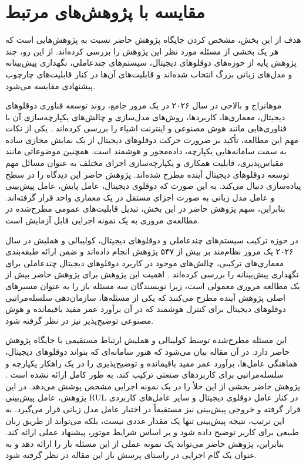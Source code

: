 \documentclass[a4paper,fleqn]{report}
\begin{document}
\section{مقایسه با پژوهش‌های مرتبط}
\label{sec:comparison}

هدف از این بخش، مشخص کردن جایگاه پژوهش حاضر نسبت به پژوهش‌هایی است که هر یک بخشی از مسئله مورد نظر این پژوهش را بررسی کرده‌اند. از این رو، چند پژوهش پایه از حوزه‌های دوقلوهای دیجیتال، سیستم‌های چندعاملی، نگهداری پیش‌بینانه و مدل‌های زبانی بزرگ انتخاب شده‌اند و قابلیت‌های آن‌ها در کنار قابلیت‌های چارچوب پیشنهادی مقایسه می‌شود.

موهانراج
 و
بالاجی
در سال ۲۰۲۶ در یک مرور جامع، روند توسعه فناوری
دوقلوهای دیجیتال، معماری‌ها، کاربردها، روش‌های مدل‌سازی و چالش‌های
یکپارچه‌سازی آن با فناوری‌هایی مانند هوش مصنوعی و اینترنت اشیاء را
بررسی کرده‌اند \cite{mohanraj2026digitaltwin}. یکی از نکات مهم این
مطالعه، تأکید بر ضرورت حرکت دوقلوهای دیجیتال از یک نمایش مجازی ساده به
سمت سامانه‌هایی یکپارچه، داده‌محور و هوشمند است. همچنین موضوعاتی مانند
مقیاس‌پذیری، قابلیت همکاری و یکپارچه‌سازی اجزای مختلف به عنوان مسائل
مهم توسعه دوقلوهای دیجیتال آینده مطرح شده‌اند. پژوهش حاضر این دیدگاه
را در سطح پیاده‌سازی دنبال می‌کند. به این صورت که دوقلوی دیجیتال،
عامل پایش، عامل پیش‌بینی و عامل مدل زبانی به صورت اجزای مستقل در یک معماری واحد قرار گرفته‌اند. بنابراین، سهم پژوهش حاضر
در این بخش، تبدیل قابلیت‌های عمومی مطرح‌شده در مطالعه‌ی مروری به یک
نمونه اجرایی قابل آزمایش است.

در حوزه ترکیب سیستم‌های چندعاملی و دوقلوهای دیجیتال،
کولیبالی
و
هملیش
در سال ۲۰۲۶ یک مرور نظام‌مند بر بیش از ۵۴۷ پژوهش انجام داده‌اند
و ضمن ارائه طبقه‌بندی معماری‌های ترکیبی، چالش‌های موجود در کاربرد
دوقلوهای دیجیتال چندعاملی برای نگهداری پیش‌بینانه را بررسی کرده‌اند
\cite{coulibaly2026madtdt}. اهمیت این پژوهش برای پژوهش حاضر
بیش از یک مطالعه مروری معمولی است، زیرا نویسندگان سه مسئله باز را به
عنوان مسیرهای اصلی پژوهش آینده مطرح می‌کنند که یکی از مسئله‌ها، سازمان‌دهی سلسله‌مراتبی دوقلوهای دیجیتال برای کنترل هوشمند که در آن برآورد عمر مفید باقیمانده و هوش مصنوعی توضیح‌پذیر نیز در نظر گرفته شود.

این مسئله مطرح‌شده توسط کولیبالی و هملیش ارتباط مستقیمی با جایگاه
پژوهش حاضر دارد. در آن مقاله بیان می‌شود که هنوز سامانه‌ای که بتواند
دوقلوهای دیجیتال، هماهنگی عامل‌ها، برآورد عمر مفید باقیمانده و
توضیح‌پذیری را در یک راهکار یکپارچه و سلسله‌مراتبی برای کاربردهای
صنعتی ترکیب کند، به طور کامل ارائه نشده است
\cite{coulibaly2026madtdt}. پژوهش حاضر بخشی از این خلأ را در یک
نمونه اجرایی مشخص پوشش می‌دهد. در این پژوهش، عامل پیش‌بینی \gls{RUL} در
کنار عامل دوقلوی دیجیتال و سایر عامل‌های کاربردی قرار گرفته و خروجی
پیش‌بینی نیز مستقیماً در اختیار عامل مدل زبانی قرار می‌گیرد. به این
ترتیب، نتیجه پیش‌بینی تنها یک مقدار عددی نیست، بلکه می‌تواند از طریق زبان طبیعی برای کاربر توضیح داده شود و بر اساس شرایط موتور، پیشنهاد عملی ارائه کند. بنابراین، پژوهش حاضر می‌تواند یک نمونه عملی از این مسئله باز را ارائه دهد و به عنوان یک گام اجرایی در راستای پرسش باز این مقاله در نظر گرفته شود.
\end{document}
